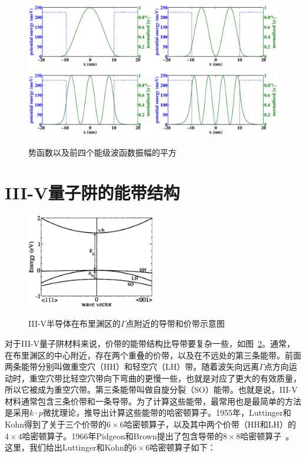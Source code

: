 \documentclass{ZJUthesis}
\begin{document}
\begin{figure}[htbp]
  \centering
  \includegraphics[width=1.0\textwidth]{./Pictures/waves.eps}\\
  \caption{势函数以及前四个能级波函数振幅的平方}
  \label{fig_waves}
\end{figure}

\section{III-V量子阱的能带结构}

\begin{figure}[htbp]
  \centering
  \includegraphics[width=0.5\textwidth]{./Pictures/bands.eps}\\
  \caption{III-V半导体在布里渊区的$\Gamma$点附近的导带和价带示意图\cite{Harrison2009Quantum}}
  \label{fig_bands}
\end{figure}

对于III-V量子阱材料来说，价带的能带结构比导带要复杂一些，如图~\ref{fig_bands}。通常，在布里渊区的中心附近，存在两个重叠的价带，以及在不远处的第三条能带。前面两条能带分别叫做重空穴（HH）和轻空穴（LH）带。随着波矢向远离$\Gamma$点方向运动时，重空穴带比轻空穴带向下弯曲的更慢一些，也就是对应了更大的有效质量，所以它被成为重空穴带。第三条能带叫做自旋分裂（SO）能带。也就是说，III-V材料通常包含三条价带和一条导带。为了计算这些能带，最常用也是最简单的方法是采用$k\cdot p$微扰理论，推导出计算这些能带的哈密顿算子。1955年，Luttinger和Kohn得到了关于三个价带的$6\times6$哈密顿算子，以及其中两个价带（HH和LH）的$4\times4$哈密顿算子\cite{Luttinger1955Motion}。1966年Pidgeon和Brown提出了包含导带的$8\times8$哈密顿算子\cite{Pidgeon1966Interband}~。这里，我们给出Luttinger和Kohn的$6\times6$哈密顿算子如下：
\end{document}
